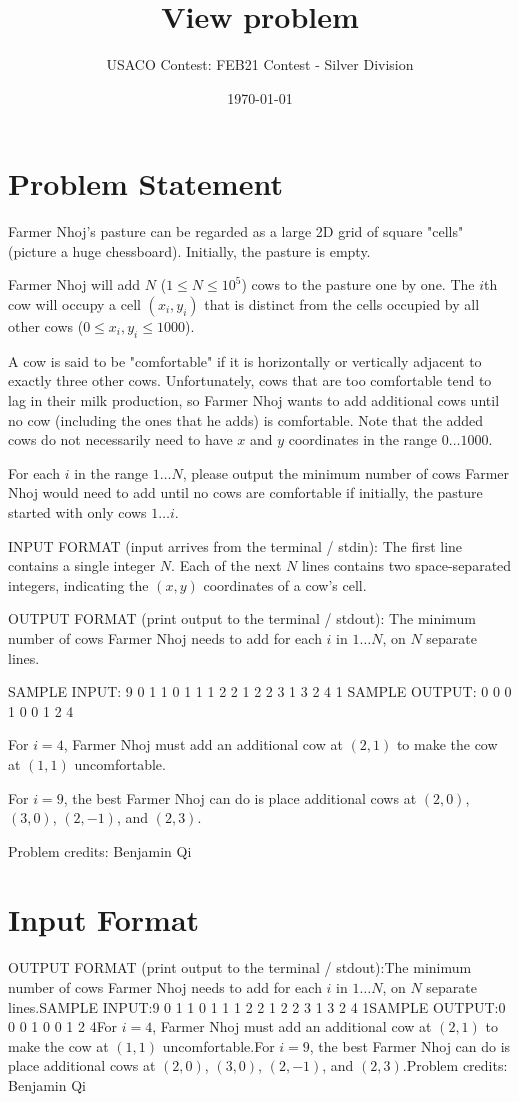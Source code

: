 \documentclass[12pt]{article}
\title{View problem}
\author{USACO Contest: FEB21 Contest - Silver Division}
\date{\today}
\begin{document}
\maketitle

\section*{Problem Statement}

Farmer Nhoj's pasture can be regarded as a large 2D grid of square "cells"
(picture a huge chessboard). Initially, the pasture is empty.

Farmer Nhoj will add $N$ ($1\le N\le 10^5$) cows to the pasture one by one. The
$i$th cow will occupy a cell $(x_i,y_i)$ that is distinct from the cells
occupied by all other cows ($0\le x_i,y_i\le 1000$).

A cow is said to be "comfortable" if it is horizontally or vertically adjacent
to exactly three other cows. Unfortunately, cows that are too comfortable tend
to lag in their milk production, so Farmer Nhoj wants to add additional cows
until no cow (including the ones that he adds) is comfortable.  Note that the
added cows do not necessarily need to have $x$ and $y$ coordinates in the range
$0 \ldots 1000$.

For each $i$ in the range $1 \ldots N$, please output the minimum number of 
cows Farmer Nhoj would need to add until no cows are comfortable if initially, 
the pasture started with only cows $1\ldots i$.  

INPUT FORMAT (input arrives from the terminal / stdin):
The first line contains a single integer $N$.  Each of the next $N$ lines
contains two space-separated integers,  indicating the $(x,y)$ coordinates of a
cow's cell. 

OUTPUT FORMAT (print output to the terminal / stdout):
The minimum number of cows Farmer Nhoj needs to add for each $i$ in
$1 \ldots N$, on $N$ separate lines.

SAMPLE INPUT:
9
0 1
1 0
1 1
1 2
2 1
2 2
3 1
3 2
4 1
SAMPLE OUTPUT: 
0
0
0
1
0
0
1
2
4

For $i=4$, Farmer Nhoj must add an additional cow at $(2,1)$ to make the cow at
$(1,1)$ uncomfortable.

For $i=9$, the best Farmer Nhoj can do is place additional cows at $(2,0)$,
$(3,0)$, $(2,-1)$, and $(2,3)$.


Problem credits: Benjamin Qi



\section*{Input Format}
OUTPUT FORMAT (print output to the terminal / stdout):The minimum number of cows Farmer Nhoj needs to add for each $i$ in
$1 \ldots N$, on $N$ separate lines.SAMPLE INPUT:9
0 1
1 0
1 1
1 2
2 1
2 2
3 1
3 2
4 1SAMPLE OUTPUT:0
0
0
1
0
0
1
2
4For $i=4$, Farmer Nhoj must add an additional cow at $(2,1)$ to make the cow at
$(1,1)$ uncomfortable.For $i=9$, the best Farmer Nhoj can do is place additional cows at $(2,0)$,
$(3,0)$, $(2,-1)$, and $(2,3)$.Problem credits: Benjamin Qi
\end{document}
